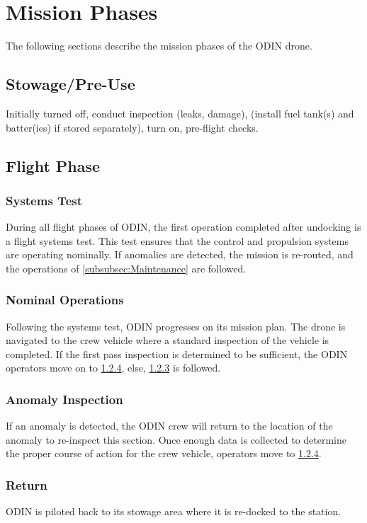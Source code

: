 \documentclass{article}
\begin{document}
\newpage

\section{Mission Phases}
The following sections describe the mission phases of the ODIN drone.

\subsection{Stowage/Pre-Use}
Initially turned off, conduct inspection (leaks, damage), (install fuel tank(s) and batter(ies) if stored separately), turn on, pre-flight checks.

\subsection{Flight Phase}
\subsubsection{Systems Test}
During all flight phases of ODIN, the first operation completed after undocking is a flight systems test. 
This test ensures that the control and propulsion systems are operating nominally. 
If anomalies are detected, the mission is re-routed, and the operations of \ref{subsubsec:Maintenance} are followed.

\subsubsection{Nominal Operations}
Following the systems test, ODIN progresses on its mission plan. 
The drone is navigated to the crew vehicle where a standard inspection of the vehicle is completed. 
If the first pass inspection is determined to be sufficient, the ODIN operators move on to \ref{subsubsec:Return}, else, \ref{subsubsec:Anomaly_Inspection} is followed. 

\subsubsection{Anomaly Inspection}
\label{subsubsec:Anomaly_Inspection}
If an anomaly is detected, the ODIN crew will return to the location of the anomaly to re-inspect this section. 
Once enough data is collected to determine the proper course of action for the crew vehicle, operators move to \ref{subsubsec:Return}. 

\subsubsection{Return}
\label{subsubsec:Return}
ODIN is piloted back to its stowage area where it is re-docked to the station. 
\end{document}
